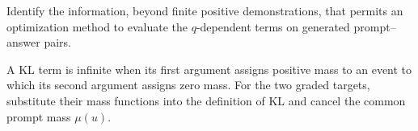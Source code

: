 \begin{exercisechunk}
\begin{enumerate}[(a)]
Identify the information, beyond finite positive demonstrations, that permits
an optimization method to evaluate the $q$-dependent terms on generated
prompt--answer pairs.
\end{enumerate}
\begin{hints}
A KL term is infinite when its first argument assigns positive mass to an
event to which its second argument assigns zero mass. For the two graded
targets, substitute their mass functions into the definition of KL and cancel
the common prompt mass $\mu(u)$.
\end{hints}
\end{exercisechunk}
